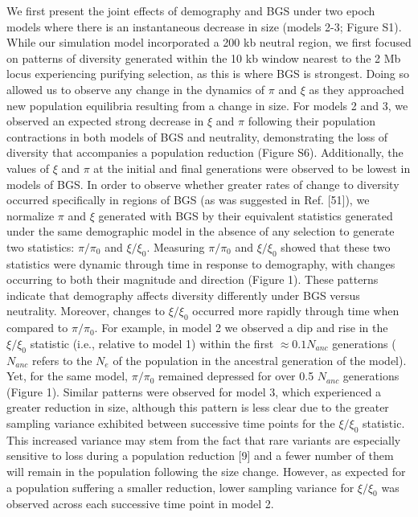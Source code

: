 \documentclass[9pt,twocolumn,twoside]{rilabRxiv}
\begin{document}
We first present the joint effects of demography and BGS under two epoch
models where there is an instantaneous decrease in size (models 2-3;
Figure S1). While our simulation model incorporated a 200 kb neutral
region, we first focused on patterns of diversity generated within the
10 kb window nearest to the 2 Mb locus experiencing purifying selection,
as this is where BGS is strongest. Doing so allowed us to observe any
change in the dynamics of $\pi$ and $\xi$ as they approached new population
equilibria resulting from a change in size. For models 2 and 3, we
observed an expected strong decrease in $\xi$ and $\pi$ following their
population contractions in both models of BGS and neutrality,
demonstrating the loss of diversity that accompanies a population
reduction (Figure S6). Additionally, the values of $\xi$ and $\pi$ at the
initial and final generations were observed to be lowest in models of
BGS. In order to observe whether greater rates of change to diversity
occurred specifically in regions of BGS (as was suggested in Ref.
[51]), we normalize $\pi$ and $\xi$ generated with BGS by their equivalent
statistics generated under the same demographic model in the absence of
any selection to generate two statistics: $\pi/\pi_0$ and
$\xi/\xi_0$. Measuring $\pi/\pi_0$ and
$\xi/\xi_0$ showed that these two statistics were dynamic
through time in response to demography, with changes occurring to both
their magnitude and direction (Figure 1). These patterns indicate that
demography affects diversity differently under BGS versus neutrality.
Moreover, changes to $\xi/\xi_0$ occurred more rapidly through
time when compared to $\pi/\pi_0$. For example, in model 2 we
observed a dip and rise in the $\xi/\xi_0$ statistic (i.e.,
relative to model 1) within the first $\approx 0.1 N_{anc}$ generations ($N_{anc}$
refers to the $N_e$ of the population in the
ancestral generation of the model). Yet, for the same model,
$\pi/\pi_0$ remained depressed for over 0.5
$N_{anc}$ generations (Figure 1). Similar patterns
were observed for model 3, which experienced a greater reduction in
size, although this pattern is less clear due to the greater sampling
variance exhibited between successive time points for the
$\xi/\xi_0$ statistic. This increased variance may stem from
the fact that rare variants are especially sensitive to loss during a
population reduction [9] and a fewer number of them will remain in
the population following the size change. However, as expected for a
population suffering a smaller reduction, lower sampling variance for
$\xi/\xi_0$ was observed across each successive time point in
model 2.
\end{document}
